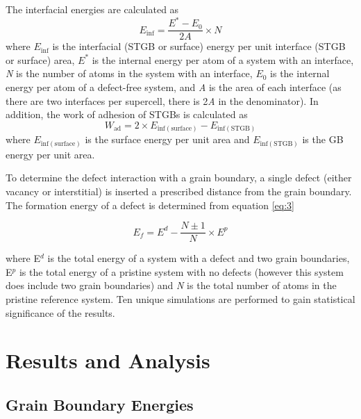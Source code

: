 \documentclass{anstrans}
\begin{document}
The interfacial energies are calculated as
%
\begin{equation}
\label{eq:eform}
E_{\mathrm{inf}} = \frac{E^*-E_0}{2A} \times N
\end{equation}
%
where $E_{\mathrm{inf}}$ is the interfacial (STGB or surface) energy per unit interface (STGB or surface) area, $E^{*}$ is the internal energy per atom of a system with an interface, \textit{N} is the number of atoms in the system with an interface, $E_{0}$ is the internal energy per atom of a defect-free system, and \textit{A} is the area of each interface (as there are two interfaces per supercell, there is 2\textit{A} in the denominator). In addition, the work of adhesion of STGBs is calculated as
%
\begin{equation}
\label{eq:fform}
W_{\mathrm{ad}} = 2 \times E_{\mathrm{inf(surface)}}-E_{\mathrm{inf(STGB)}}
\end{equation}
%
where $E_{\mathrm{inf(surface)}}$ is the surface energy per unit area and $E_{\mathrm{inf(STGB)}}$ is the GB energy per unit area.

To determine the defect interaction with a grain boundary, a single defect (either vacancy or interstitial) is inserted a prescribed distance from the grain boundary. The formation energy of a defect is determined from equation \ref{eq:3}

\begin{equation}
\label{eq:3}
E_f = E^d - \frac{N\pm1}{N}\times E^p 
\end{equation}

where E$^d$ is the total energy of a system with a defect and two grain boundaries, E$^p$ is the total energy of a pristine system with no defects (however this system does include two grain boundaries) and \textit{N} is the total number of atoms in the pristine reference system. Ten unique simulations are performed to gain statistical significance of the results.

\section{Results and Analysis}

\subsection{Grain Boundary Energies}
\end{document}
